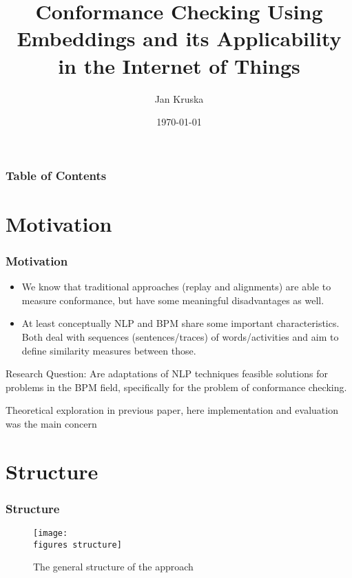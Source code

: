 \documentclass{beamer}
\title{Conformance Checking Using Embeddings and its Applicability in the Internet of Things}
\author{Jan Kruska}
\date{\today}
\newcommand{\figures}{../figures/}
\begin{document}
	\beamertemplatenavigationsymbolsempty
	\frame{\titlepage}
	
	\begin{frame}
		\frametitle{Table of Contents}
		\tableofcontents
	\end{frame}
	\section{Motivation}
	\begin{frame}
		\frametitle{Motivation}
		\begin{itemize}
			\item We know that traditional approaches (replay and alignments) are able to measure conformance, but have some meaningful disadvantages as well.
			\item At least conceptually NLP and BPM share some important characteristics. Both deal with sequences (sentences/traces) of words/activities and aim to define similarity measures between those.
		\end{itemize}
		\begin{block}{Research Question:}
			Are adaptations of NLP techniques feasible solutions for problems in the BPM field, specifically for the problem of conformance checking.
		\end{block}
		\alert{Theoretical exploration in previous paper, here implementation and evaluation was the main concern}
	\end{frame}
	
	\section{Structure}
	\begin{frame}
		\frametitle{Structure}
		\begin{figure}
			\texttt{[image: \\figures structure]}
			\caption{The general structure of the approach}
			\label{fig:structure}
		\end{figure}
	\end{frame}
	
\end{document}
